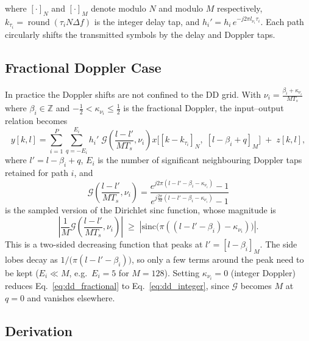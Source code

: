 \documentclass[11pt,a4paper]{article}
\newcommand{\deltaf}{\Delta f}
\begin{document}
where $[\cdot]_N$ and $[\cdot]_M$ denote modulo $N$ and modulo $M$
respectively, $k_{\tau_i} = \operatorname{round}(\tau_i N\deltaf)$ is
the integer delay tap, and $h_i' = h_i\,e^{-j2\pi l_{\nu_i}\tau_i}$.
Each path circularly shifts the transmitted symbols by the delay and
Doppler taps.

\subsection{Fractional Doppler Case}

In practice the Doppler shifts are not confined to the DD grid. With
$\nu_i = \frac{\beta_i + \kappa_{\nu_i}}{MT_s}$ where
$\beta_i\in\mathbb{Z}$ and $-\tfrac{1}{2}<\kappa_{\nu_i}\le\tfrac{1}{2}$
is the fractional Doppler, the input--output relation
becomes~\cite{raviteja_tvt2019,raviteja_wcnc2018}
\begin{equation}
  y[k,l] = \sum_{i=1}^{P}\sum_{q=-E_i}^{E_i}
  h_i'\;
  \mathcal{G}\!\left(\frac{l-l'}{MT_s},\nu_i\right)
  x\!\bigl[\!\left[k-k_{\tau_i}\right]_N,\;
            \left[l-\beta_i+q\right]_M\bigr]
  \;+\; z[k,l],
  \label{eq:dd_fractional}
\end{equation}
where $l' = l-\beta_i+q$, $E_i$ is the number of significant
neighbouring Doppler taps retained for path $i$, and
\begin{equation}
  \mathcal{G}\!\left(\frac{l-l'}{MT_s},\nu_i\right)
  = \frac{e^{j2\pi(l-l'-\beta_i-\kappa_{\nu_i})}-1}
         {e^{j\frac{2\pi}{M}(l-l'-\beta_i-\kappa_{\nu_i})}-1}
  \label{eq:G_frac}
\end{equation}
is the sampled version of the Dirichlet sinc function, whose magnitude
is
\begin{equation}
  \left|\frac{1}{M}\mathcal{G}\!\left(\frac{l-l'}{MT_s},\nu_i\right)\right|
  \;\ge\;
  \left|\mathrm{sinc}\!\bigl(\pi((l-l'-\beta_i)-\kappa_{\nu_i})\bigr)\right|.
\end{equation}
This is a two-sided decreasing function that peaks at
$l' = [l-\beta_i]_M$. The side lobes decay as
$1/\bigl(\pi(l-l'-\beta_i)\bigr)$, so only a few terms around the
peak need to be kept ($E_i \ll M$, e.g.\ $E_i = 5$ for $M=128$).
Setting $\kappa_{\nu_i}=0$ (integer Doppler) reduces
Eq.~\eqref{eq:dd_fractional} to Eq.~\eqref{eq:dd_integer}, since
$\mathcal{G}$ becomes $M$ at $q=0$ and vanishes elsewhere.

\subsection{Derivation}
\label{sec:dd_derivation}
\end{document}

